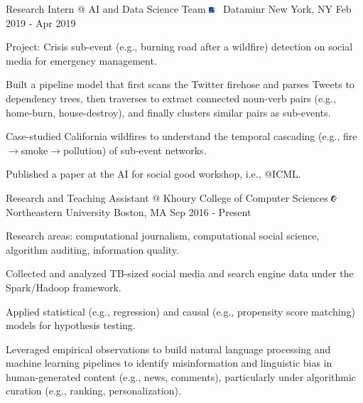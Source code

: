 \documentclass[letterpaper]{awesome-cv}
\begin{document}
\begin{cventries}
{\begin{cvitems}
      \end{cvitems}
    }
  \cventry
    {Research Intern @ AI and Data Science Team}
    {\includegraphics[width=0.016\textwidth]{../images/logos/dataminr.png}~ Dataminr}
    {New York, NY}
    {Feb 2019 - Apr 2019}
    {
      \begin{cvitems}
        \item {Project: Crisis sub-event (e.g., burning road after a wildfire) detection on social media for emergency management.}
        \item {Built a pipeline model that first scans the Twitter firehose and parses Tweets to dependency trees, then traverses to extract connected noun-verb pairs (e.g., home-burn, house-destroy), and finally clusters similar pairs as sub-events.}
        \item {Case-studied California wildfires to understand the temporal cascading (e.g., fire$\to$smoke$\to$pollution) of sub-event networks.}
        \item {Published a paper at the AI for social good workshop, i.e., @ICML.}
      \end{cvitems}
    }
  \cventry
    {Research and Teaching Assistant @ Khoury College of Computer Sciences}
    {\includegraphics[width=0.016\textwidth]{../images/logos/northeastern.png}~ Northeastern University}
    {Boston, MA}
    {Sep 2016 - Present}
    {
      \begin{cvitems}
        \item {Research areas: computational journalism, computational social science, algorithm auditing, information quality.}
        \item {Collected and analyzed TB-sized social media and search engine data under the Spark/Hadoop framework.}
        \item {Applied statistical (e.g., regression) and causal (e.g., propensity score matching) models for hypothesis testing.}
        \item {Leveraged empirical observations to build natural language processing and machine learning pipelines to identify misinformation and linguistic bias in human-generated content (e.g., news, comments), particularly under algorithmic curation (e.g., ranking, personalization).}

\end{cvitems}}
\end{cventries}
\end{document}
